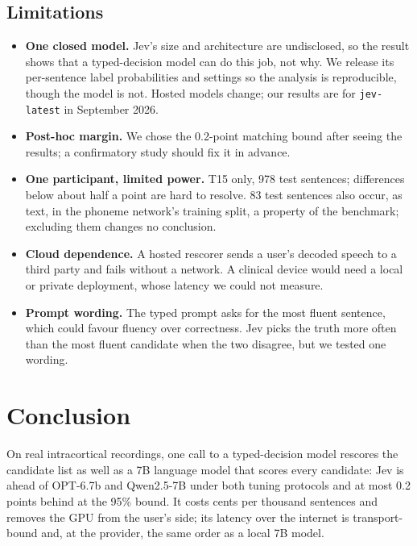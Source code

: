 \documentclass[11pt]{article}
\begin{document}
\subsection{Limitations}
\label{sec:limits}

\begin{itemize}\itemsep2pt
\item \textbf{One closed model.} Jev's size and architecture are undisclosed, so the
  result shows that a typed-decision model can do this job, not why. We release its
  per-sentence label probabilities and settings so the analysis is reproducible, though
  the model is not. Hosted models change; our results are for \texttt{jev-latest} in
  September 2026.
\item \textbf{Post-hoc margin.} We chose the 0.2-point matching bound after seeing the
  results; a confirmatory study should fix it in advance.
\item \textbf{One participant, limited power.} T15 only, 978 test sentences; differences
  below about half a point are hard to resolve. 83 test sentences also occur, as text, in
  the phoneme network's training split, a property of the benchmark; excluding them
  changes no conclusion.
\item \textbf{Cloud dependence.} A hosted rescorer sends a user's decoded speech to a third
  party and fails without a network. A clinical device would need a local or private
  deployment, whose latency we could not measure.
\item \textbf{Prompt wording.} The typed prompt asks for the most fluent sentence, which
  could favour fluency over correctness. Jev picks the truth more often than the most
  fluent candidate when the two disagree, but we tested one wording.
\end{itemize}

\section{Conclusion}

On real intracortical recordings, one call to a typed-decision model rescores the
candidate list as well as a 7B language model that scores every candidate: Jev is ahead
of OPT-6.7b and Qwen2.5-7B under both tuning protocols and at most 0.2 points behind at
the 95\% bound. It costs cents per thousand sentences and removes the GPU from the user's
side; its latency over the internet is transport-bound and, at the provider, the same
order as a local 7B model.
\end{document}
